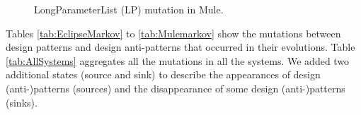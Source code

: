 \begin{figure}
\begin{center}
\caption{LongParameterList (LP) mutation in Mule.}
\label{Figure:LP-Mutations-Mule}
\end{center}
\end{figure}



Tables \ref{tab:EclipseMarkov} to \ref{tab:Mulemarkov} show the mutations between design patterns and design anti-patterns that occurred in their evolutions. Table \ref{tab:AllSystems} aggregates all the mutations in all the systems. We added two additional states (source and sink) to describe the appearances of design (anti-)patterns (sources) and the disappearance of some design (anti-)patterns (sinks).


